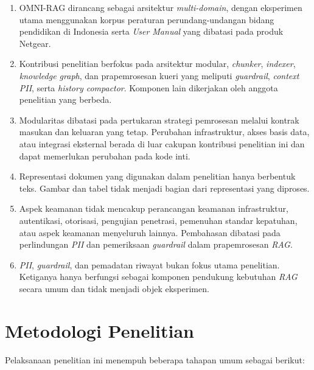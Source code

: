 \begin{enumerate}
    \item OMNI-RAG dirancang sebagai arsitektur \emph{multi-domain}, dengan eksperimen utama menggunakan korpus peraturan perundang-undangan bidang pendidikan di Indonesia serta \emph{User Manual} yang dibatasi pada produk Netgear.
    \item Kontribusi penelitian berfokus pada arsitektur modular, \emph{chunker}, \emph{indexer}, \emph{knowledge graph}, dan prapemrosesan kueri yang meliputi \emph{guardrail}, \emph{context PII}, serta \emph{history compactor}. Komponen lain dikerjakan oleh anggota penelitian yang berbeda.
    \item Modularitas dibatasi pada pertukaran strategi pemrosesan melalui kontrak masukan dan keluaran yang tetap. Perubahan infrastruktur, akses basis data, atau integrasi eksternal berada di luar cakupan kontribusi penelitian ini dan dapat memerlukan perubahan pada kode inti.
    \item Representasi dokumen yang digunakan dalam penelitian hanya berbentuk teks. Gambar dan tabel tidak menjadi bagian dari representasi yang diproses.
    \item Aspek keamanan tidak mencakup perancangan keamanan infrastruktur, autentikasi, otorisasi, pengujian penetrasi, pemenuhan standar kepatuhan, atau aspek keamanan menyeluruh lainnya. Pembahasan dibatasi pada perlindungan \emph{PII} dan pemeriksaan \emph{guardrail} dalam prapemrosesan \emph{RAG}.
    \item \emph{PII}, \emph{guardrail}, dan pemadatan riwayat bukan fokus utama penelitian. Ketiganya hanya berfungsi sebagai komponen pendukung kebutuhan \emph{RAG} secara umum dan tidak menjadi objek eksperimen.
\end{enumerate}

\section{Metodologi Penelitian}

\noindent Pelaksanaan penelitian ini menempuh beberapa tahapan umum sebagai berikut:

